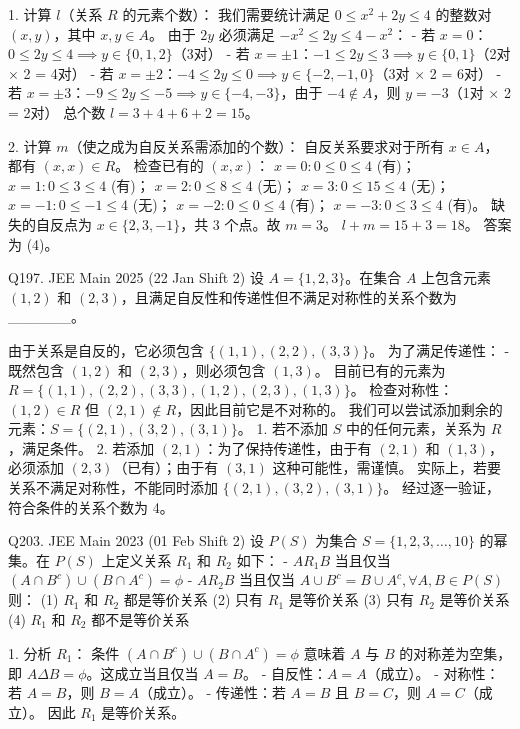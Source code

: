 \begin{questions}
\begin{solution}
1. 计算 $l$（关系 $R$ 的元素个数）：
我们需要统计满足 $0 \le x^2 + 2y \le 4$ 的整数对 $(x, y)$，其中 $x, y \in A$。
由于 $2y$ 必须满足 $-x^2 \le 2y \le 4 - x^2$：
- 若 $x = 0$：$0 \le 2y \le 4 \implies y \in \{0, 1, 2\}$（3对）
- 若 $x = \pm 1$：$-1 \le 2y \le 3 \implies y \in \{0, 1\}$（2对 $\times$ 2 = 4对）
- 若 $x = \pm 2$：$-4 \le 2y \le 0 \implies y \in \{-2, -1, 0\}$（3对 $\times$ 2 = 6对）
- 若 $x = \pm 3$：$-9 \le 2y \le -5 \implies y \in \{-4, -3\}$，由于 $-4 \notin A$，则 $y = -3$（1对 $\times$ 2 = 2对）
总个数 $l = 3 + 4 + 6 + 2 = 15$。

2. 计算 $m$（使之成为自反关系需添加的个数）：
自反关系要求对于所有 $x \in A$，都有 $(x, x) \in R$。
检查已有的 $(x, x)$：
$x=0: 0 \le 0 \le 4$ (有)； $x=1: 0 \le 3 \le 4$ (有)； $x=2: 0 \le 8 \le 4$ (无)； $x=3: 0 \le 15 \le 4$ (无)；
$x=-1: 0 \le -1 \le 4$ (无)； $x=-2: 0 \le 0 \le 4$ (有)； $x=-3: 0 \le 3 \le 4$ (有)。
缺失的自反点为 $x \in \{2, 3, -1\}$，共 $3$ 个点。故 $m = 3$。
$l + m = 15 + 3 = 18$。
答案为 (4)。
\end{solution}
\question
Q197. JEE Main 2025 (22 Jan Shift 2)
设 $A = \{1, 2, 3\}$。在集合 $A$ 上包含元素 $(1, 2)$ 和 $(2, 3)$，且满足自反性和传递性但不满足对称性的关系个数为 \_\_\_\_\_\_。

\begin{solution}
由于关系是自反的，它必须包含 $\{(1, 1), (2, 2), (3, 3)\}$。
为了满足传递性：
- 既然包含 $(1, 2)$ 和 $(2, 3)$，则必须包含 $(1, 3)$。
目前已有的元素为 $R = \{(1, 1), (2, 2), (3, 3), (1, 2), (2, 3), (1, 3)\}$。
检查对称性：$(1, 2) \in R$ 但 $(2, 1) \notin R$，因此目前它是不对称的。
我们可以尝试添加剩余的元素：$S = \{(2, 1), (3, 2), (3, 1)\}$。
1. 若不添加 $S$ 中的任何元素，关系为 $R$，满足条件。
2. 若添加 $(2, 1)$：为了保持传递性，由于有 $(2, 1)$ 和 $(1, 3)$，必须添加 $(2, 3)$（已有）；由于有 $(3, 1)$ 这种可能性，需谨慎。
实际上，若要关系不满足对称性，不能同时添加 $\{(2,1), (3,2), (3,1)\}$。
经过逐一验证，符合条件的关系个数为 4。
\end{solution}

\question
Q203. JEE Main 2023 (01 Feb Shift 2)
设 $P(S)$ 为集合 $S = \{1, 2, 3, \dots, 10\}$ 的幂集。在 $P(S)$ 上定义关系 $R_1$ 和 $R_2$ 如下：
- $A R_1 B$ 当且仅当 $(A \cap B^c) \cup (B \cap A^c) = \phi$
- $A R_2 B$ 当且仅当 $A \cup B^c = B \cup A^c, \forall A, B \in P(S)$
则：
(1) $R_1$ 和 $R_2$ 都是等价关系
(2) 只有 $R_1$ 是等价关系
(3) 只有 $R_2$ 是等价关系
(4) $R_1$ 和 $R_2$ 都不是等价关系

\begin{solution}
1. 分析 $R_1$：
条件 $(A \cap B^c) \cup (B \cap A^c) = \phi$ 意味着 $A$ 与 $B$ 的对称差为空集，即 $A \Delta B = \phi$。这成立当且仅当 $A = B$。
- 自反性：$A = A$（成立）。
- 对称性：若 $A = B$，则 $B = A$（成立）。
- 传递性：若 $A = B$ 且 $B = C$，则 $A = C$（成立）。
因此 $R_1$ 是等价关系。


\end{solution}
\end{questions}
